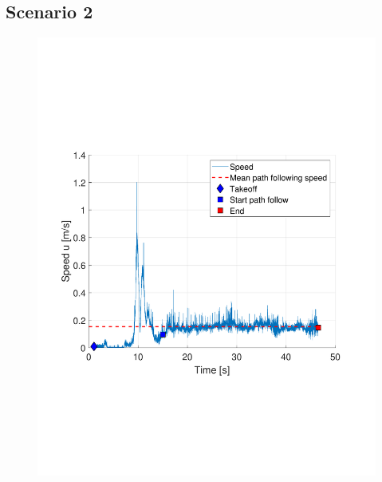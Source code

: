 \documentclass[numbered,pdftex]{ohio-etd}
\begin{document}
\subsection{Scenario 2}
\begin{figure}[H]
	\centering
	\includegraphics[trim = 0 150 0 200, clip, width=12cm]{Figures/results/compareFigures/2u}
	\caption{}
	\label{fig:2u}
\end{figure}
\end{document}
